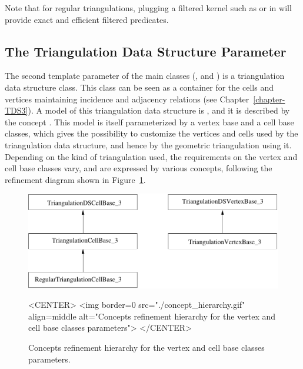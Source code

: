 Note that for regular triangulations, plugging a filtered kernel such
as  or
 in
 will 
provide exact and efficient filtered predicates.


\subsection{The Triangulation Data Structure Parameter\label{Triangulation3-sec-tds}}

The second template parameter of the main classes (,
 and ) is a
triangulation data structure class.  This class can be seen as a container for
the cells and vertices maintaining incidence and adjacency relations (see
Chapter~\ref{chapter-TDS3}).  A model of this triangulation data structure is
,
and it is described by the  concept
.  This model is itself
parameterized by a vertex base and a cell base classes, which gives the
possibility to customize the vertices and cells used by the triangulation data
structure, and hence by the geometric triangulation using it.  Depending on the
kind of triangulation used, the requirements on the vertex and cell base
classes vary, and are expressed by various concepts, following the refinement
diagram shown in Figure~\ref{T3-concept-hierarchy}.

\begin{figure}[htbp]
\begin{ccTexOnly}
\begin{center}
\includegraphics[width=13cm]{Triangulation_3/concept_hierarchy}
\end{center}
\end{ccTexOnly}
\begin{ccHtmlOnly}
<CENTER>
<img border=0 src="./concept_hierarchy.gif" align=middle
alt="Concepts refinement hierarchy for the vertex and cell base classes parameters">
</CENTER>
\end{ccHtmlOnly}
\caption{Concepts refinement hierarchy for the vertex and cell base classes
parameters.
\label{T3-concept-hierarchy}}
\end{figure}

